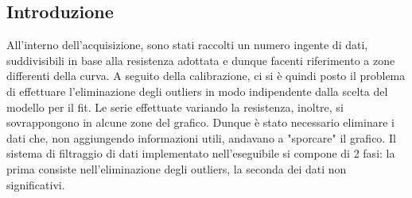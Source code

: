 \documentclass{article}[a4paper, oneside, 11pt]
\begin{document}
\subsection{Introduzione}
All'interno dell'acquisizione, sono stati raccolti un numero ingente di dati,
suddivisibili in base alla resistenza adottata e dunque facenti riferimento
a zone differenti della curva. A seguito della calibrazione, ci si è quindi
posto il problema di effettuare l'eliminazione degli outliers in modo
indipendente dalla scelta del modello per il fit. Le serie effettuate
variando la resistenza, inoltre, si sovrappongono in alcune zone del
grafico. Dunque è stato necessario eliminare i dati che, non aggiungendo
informazioni utili, andavano a "sporcare" il grafico.
Il sistema di filtraggio di dati implementato
nell'eseguibile si compone di 2 fasi: la prima consiste nell'eliminazione degli
outliers, la seconda dei dati non significativi.
\end{document}
